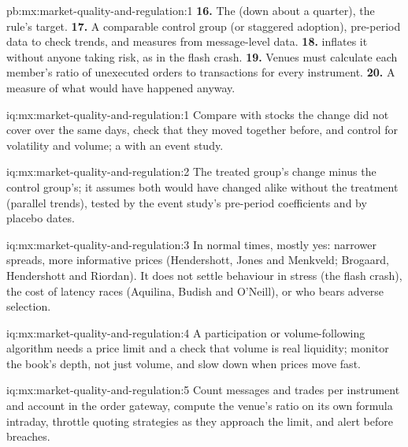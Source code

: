 \begin{solution}{pb:mx:market-quality-and-regulation:1}
\textbf{16.} The  (down about a quarter), the rule's target.
\textbf{17.} A comparable control group (or staggered adoption), pre-period data to check trends, and measures from message-level data.
\textbf{18.}  inflates it without anyone taking risk, as in the flash crash.
\textbf{19.} Venues must calculate each member's ratio of unexecuted orders to transactions for every instrument.
\textbf{20.} A measure of what would have happened anyway.
\end{solution}

\begin{solution}{iq:mx:market-quality-and-regulation:1}
Compare with stocks the change did not cover over the same days, check that they moved together before, and control for volatility and volume; a
 with an event study.
\end{solution}

\begin{solution}{iq:mx:market-quality-and-regulation:2}
The treated group's change minus the control group's; it assumes both would have changed alike without the treatment (parallel trends), tested by
the event study's pre-period coefficients and by placebo dates.
\end{solution}

\begin{solution}{iq:mx:market-quality-and-regulation:3}
In normal times, mostly yes: narrower spreads, more informative prices (Hendershott, Jones and Menkveld; Brogaard, Hendershott and Riordan). It does
not settle behaviour in stress (the flash crash), the cost of latency races (Aquilina, Budish and O'Neill), or who bears adverse selection.
\end{solution}

\begin{solution}{iq:mx:market-quality-and-regulation:4}
A participation or volume-following algorithm needs a price limit and a check that volume is real liquidity; monitor the book's depth, not just volume,
and slow down when prices move fast.
\end{solution}

\begin{solution}{iq:mx:market-quality-and-regulation:5}
Count messages and trades per instrument and account in the order gateway, compute the venue's ratio on its own formula intraday, throttle quoting
strategies as they approach the limit, and alert before breaches.
\end{solution}

